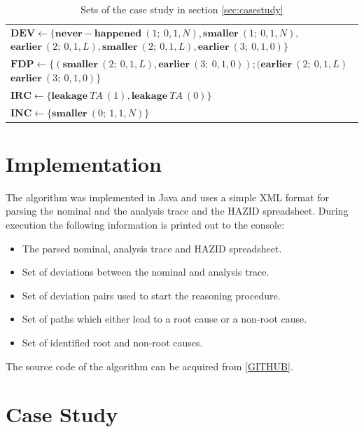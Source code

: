 \documentclass[conference]{IEEEtran}
\begin{document}
\begin{table}
\label{tbl:algVariables}
\begin{tabular}{p{12cm}}
\hline
   $\mathbf{DEV} \leftarrow \{ \mathbf{never-happened} ~(1;~0,1,N),\mathbf{smaller} ~(1;~ 0,1,N),$ 
   $\mathbf{earlier} ~(2;~ 0,1,L),\mathbf{smaller} ~(2;~ 0,1,L),\mathbf{earlier} ~(3;~ 0,1,0) \}$ \\

   $\mathbf{FDP} \leftarrow \{ (\mathbf{smaller} ~(2;~ 0,1,L),\mathbf{earlier} ~(3;~ 0,1,0) );(\mathbf{earlier} ~(2;~ 0,1,L) $
   $\mathbf{earlier} ~(3;~ 0,1,0) \}$ \\

   $\mathbf{IRC} \leftarrow \{ \mathbf{leakage} ~TA~(1), \mathbf{leakage} ~TA~(0) \}$ \\

   $\mathbf{INC} \leftarrow \{ \mathbf{smaller} ~(0;~1,1,N) \}$ \\
\hline
\end{tabular}
\caption{Sets of the case study in section \ref{sec:casestudy} }
\end{table}

\section{Implementation}
The algorithm was implemented in Java and uses a simple XML format for parsing the nominal and the analysis trace and the HAZID spreadsheet. During execution the following information is printed out to the console:

\begin{itemize}
\item The parsed nominal, analysis trace and HAZID spreadsheet.
\item Set of deviations between the nominal and analysis trace.
\item Set of deviation pairs used to start the reasoning procedure.
\item Set of paths which either lead to a root cause or a non-root cause.
\item Set of identified root and non-root causes.
\end{itemize}

The source code of the algorithm can be acquired from \ref{GITHUB}.

\section{Case Study}
\end{document}
